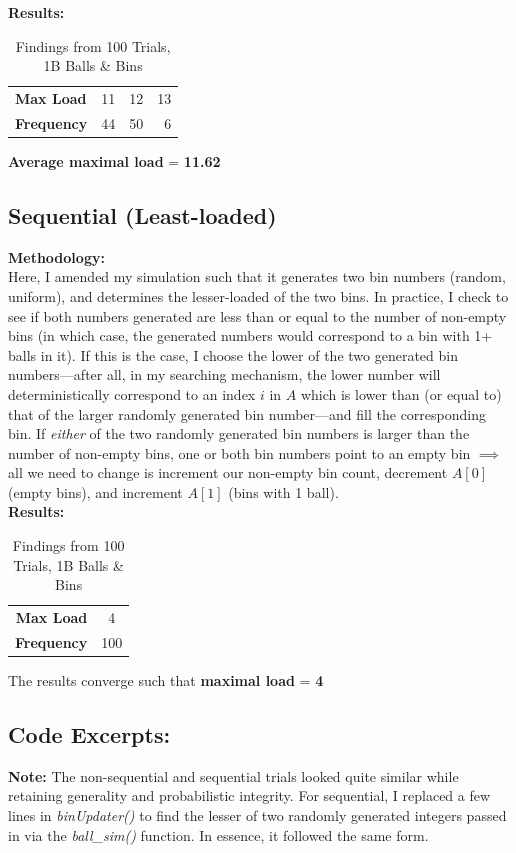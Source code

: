 \documentclass[conference]{styles/acmsiggraph}
\newcommand{\?}{\stackrel{?}{=}}
\begin{document}
\textbf{Results:}
\begin{table}[htbp]
  \centering
    \begin{tabular}{l||r|r|r}
    \textbf{Max Load} & 11    & 12    & 13 \\
    \textbf{Frequency} & 44    & 50    & 6 \\
    \end{tabular}%
  \caption{Findings from 100 Trials, 1B Balls \& Bins}
  \label{tab:BallsBins1}%
  \textbf{Average maximal load} = \textbf{11.62}
\end{table}%



\subsection{Sequential (Least-loaded)}
\textbf{Methodology:}\\
Here, I amended my simulation such that it generates two bin numbers (random, uniform), and determines the lesser-loaded of the two bins.  In practice, I check to see if both numbers generated are less than or equal to the number of non-empty bins (in which case, the generated numbers would correspond to a bin with 1+ balls in it).  If this is the case, I choose the lower of the two generated bin numbers---after all, in my searching mechanism, the lower number will deterministically correspond to an index $i$ in $A$ which is lower than (or equal to) that of the larger randomly generated bin number---and fill the corresponding bin.  If \textit{either} of the two randomly generated bin numbers is larger than the number of non-empty bins, one or both bin numbers point to an empty bin $\implies$ all we need to change is increment our non-empty bin count, decrement $A[0]$ (empty bins), and increment $A[1]$ (bins with 1 ball).\\

\textbf{Results:}
\begin{table}[h!]
  \centering
    \begin{tabular}{r||c}
    \textbf{Max Load} & 4 \\
    \textbf{Frequency} & 100 \\
    \end{tabular}%
  \caption{Findings from 100 Trials, 1B Balls \& Bins}
      The results converge such that \textbf{maximal load} = \textbf{4}
  \label{tab:BallsBins2}%
\end{table}
\FloatBarrier

\subsection{Code Excerpts:}
\textbf{Note:} The non-sequential and sequential trials looked quite similar while retaining generality and probabilistic integrity.  For sequential, I replaced a few lines in \textit{binUpdater()} to find the lesser of two randomly generated integers passed in via the \textit{ball\_sim()} function.  In essence, it followed the same form. \\
\end{document}
